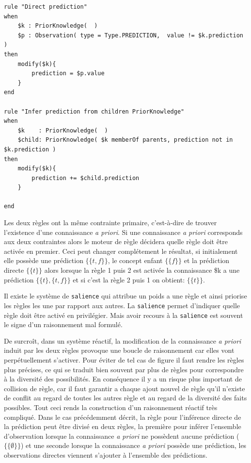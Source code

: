 \begin{refsegment}
\begin{lstlisting}[style=drl-style,caption=conflit]
rule "Direct prediction"
when
	$k : PriorKnowledge(  )
	$p : Observation( type = Type.PREDICTION,  value != $k.prediction )
then
	modify($k){
		prediction = $p.value
	}
end

rule "Infer prediction from children PriorKnowledge"
when
	$k    : PriorKnowledge(  )
	$child: PriorKnowledge( $k memberOf parents, prediction not in $k.prediction )
then
	modify($k){
		prediction += $child.prediction
	}

end
\end{lstlisting}

Les deux règles ont la même contrainte primaire, c'est-à-dire de trouver l'existence d'une connaissance \textit{a priori}. Si une connaissance \textit{a priori} corresponds aux deux contraintes alors le moteur de règle décidera quelle règle doit être activée en premier. Ceci peut changer complétement le résultat, si  initialement elle possède une prédiction $\{\{t,f\}\}$, le concept enfant  $\{\{f\}\}$ et la prédiction directe $\{\{t\}\}$ alors lorsque la règle 1 puis 2 est activée la connaissance \$k a une prédiction  $\{\{t\},\{t,f\}\}$ et si c'est la règle 2 puis 1 on obtient:  $\{\{t\}\}$.

Il existe le système de \texttt{salience} qui attribue un poids a une règle et ainsi priorise les règles les une par rapport aux autres. La \texttt{salience} permet d'indiquer quelle règle doit être activé en privilégier. Mais avoir recours à la \texttt{salience}  est souvent le signe d'un raisonnement mal formulé. 

De surcroît, dans un système réactif, la modification de la connaissance \textit{a priori} induit par les deux règles provoque une boucle de raisonnement car elles vont perpétuellement s'activer. Pour éviter de tel cas de figure il faut rendre les règles plus précises, ce qui se traduit bien souvent par plus de règles pour correspondre à la diversité des possibilités. En conséquence  il y a un risque plus important de collision de règle, car il faut garantir a chaque ajout nouvel de règle qu'il n'existe de conflit au regard de toutes les autres règle et au regard de la diversité des faits possibles. Tout ceci rends la construction d'un raisonnement réactif très compliqué. Dans le cas précédemment décrit, la règle  pour l'inférence directe de la  prédiction peut être divisé en deux règles, la première pour inférer l'ensemble d'observation lorsque la connaissance \textit{a priori} ne possèdent aucune prédiction ($\{\{\emptyset\}\}$) et une seconde lorsque la connaissance \textit{a priori} possède une prédiction, les observations directes viennent s'ajouter à l'ensemble des prédictions.


\end{refsegment}

